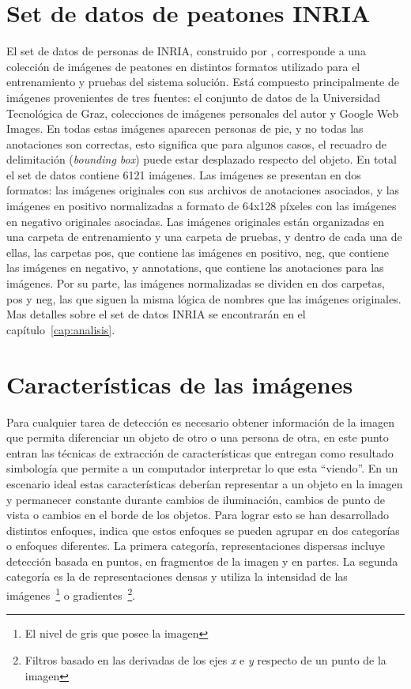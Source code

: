 \section{Set de datos de peatones INRIA}
\label{preliminares:deteccion}

El set de datos de personas de INRIA, construido por \cite{dalal2005}, corresponde a una colección de imágenes de peatones en distintos formatos utilizado para el entrenamiento y pruebas del sistema solución. Está compuesto principalmente de imágenes provenientes de tres fuentes: el conjunto de datos de la Universidad Tecnológica de Graz, colecciones de imágenes personales del autor y Google Web Images. En todas estas imágenes aparecen personas de pie, y no todas las anotaciones son correctas, esto significa que para algunos casos, el recuadro de delimitación (\textit{bounding box}) puede estar desplazado respecto del objeto. En total el set de datos  contiene 6121 imágenes. Las imágenes se presentan en dos formatos: las imágenes originales con sus archivos de anotaciones asociados, y las imágenes en positivo normalizadas a formato de 64x128 píxeles con las imágenes en negativo originales asociadas. Las imágenes originales están organizadas en una carpeta de entrenamiento y una carpeta de pruebas, y dentro de cada una de ellas, las carpetas pos, que contiene las imágenes en positivo, neg, que contiene las imágenes en negativo, y annotations, que contiene las anotaciones para las imágenes. Por su parte, las imágenes normalizadas se dividen en dos carpetas, pos y neg, las que siguen la misma lógica de nombres que las imágenes originales. Mas detalles sobre el set de datos INRIA se encontrarán en el capítulo~\ref{cap:analisis}.

\section{Características de las imágenes}
\label{preliminares:caract}

Para cualquier tarea de detección es necesario obtener información de la imagen que permita diferenciar un objeto de otro o una persona de otra, en este punto entran las técnicas de extracción de características que entregan como resultado simbología que permite a un computador interpretar lo que esta ``viendo''. En un escenario ideal estas características deberían representar a un objeto en la imagen y permanecer constante durante cambios de iluminación, cambios de punto de vista o cambios en el borde de los objetos. Para lograr esto se han desarrollado distintos enfoques, \cite{dalal2006} indica que estos enfoques se pueden agrupar en dos categorías o enfoques diferentes. La primera categoría, representaciones dispersas incluye detección basada en puntos, en fragmentos de la imagen y en partes. La segunda categoría es la de representaciones densas y utiliza la intensidad de las imágenes~\footnote{El nivel de gris que posee la imagen} o gradientes~\footnote{Filtros basado en las derivadas de los ejes \textit{x} e \textit{y} respecto de un punto de la imagen}.

